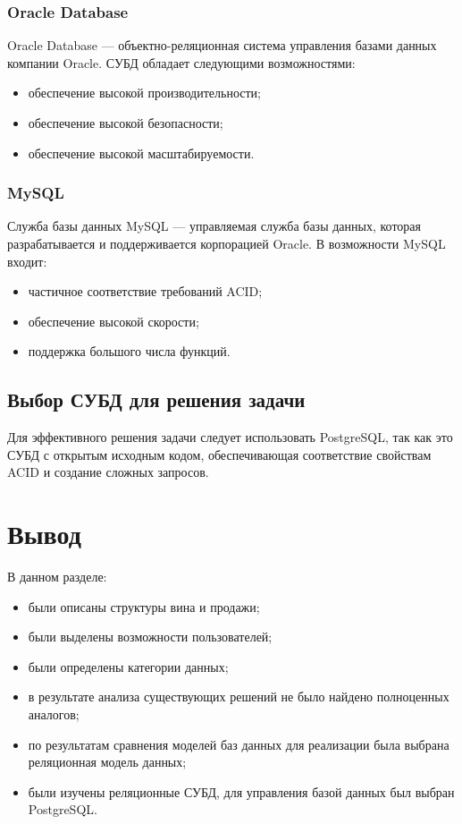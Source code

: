 \subsubsection{Oracle Database}

Oracle Database --- объектно-реляционная система управления базами данных компании Oracle. СУБД обладает следующими возможностями:

\begin{itemize}
	\item обеспечение высокой производительности;
	\item обеспечение высокой безопасности;
	\item обеспечение высокой масштабируемости.
\end{itemize}

\subsubsection{MySQL}

Служба базы данных MySQL --- управляемая служба базы данных, которая разрабатывается и поддерживается корпорацией Oracle. В возможности MySQL входит:

\begin{itemize}
	\item частичное соответствие требований ACID;
	\item обеспечение высокой скорости;
	\item поддержка большого числа функций.
\end{itemize}

\subsection{Выбор СУБД для решения задачи}

Для эффективного решения задачи следует использовать PostgreSQL, так как это СУБД с открытым исходным кодом, обеспечивающая соответствие свойствам ACID и создание сложных запросов.

\section{Вывод}

В данном разделе:
\begin{itemize}
	\item были описаны структуры вина и продажи;
	\item были выделены возможности пользователей;
	\item были определены категории данных; 
	\item в результате анализа существующих решений не было найдено полноценных аналогов;
	\item по результатам сравнения моделей баз данных для реализации была выбрана реляционная модель данных;
	\item были изучены реляционные СУБД, для управления базой данных был выбран PostgreSQL.
\end{itemize}

